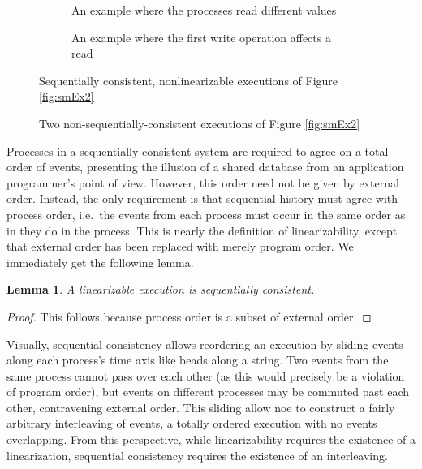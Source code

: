 \documentclass[]             %
{NASA}                       %
\newtheorem{lemma}[theorem]{Lemma}
\theoremstyle{definition}
\begin{document}
\begin{figure}[p]
  \begin{subfigure}{1\textwidth}
    \centering
    
    \caption{An example where the processes read different values}
    \label{fig:smEx1L1}
  \end{subfigure}
  \begin{subfigure}{1\textwidth}
    
    \caption{An example where the first write operation affects a read}
    \label{fig:smEx4S2}
  \end{subfigure}
  \caption{Sequentially consistent, nonlinearizable executions of Figure \ref{fig:smEx2}}
  \label{fig:smEx3}
\end{figure}
\begin{figure}[p]
  \begin{subfigure}{1\textwidth}
    \centering
    
    \caption{}
    \label{fig:smEx1L1}
  \end{subfigure}
  \begin{subfigure}{1\textwidth}
    
    \caption{}
    \label{fig:smEx4S2}
  \end{subfigure}
  \caption{Two non-sequentially-consistent executions of Figure \ref{fig:smEx2}}
  \label{fig:smEx3}
\end{figure}

Processes in a sequentially consistent system are required to agree on
a total order of events, presenting the illusion of a shared database
from an application programmer's point of view. However, this order
need not be given by external order. Instead, the only requirement is
that sequential history must agree with process order, i.e.~the events
from each process must occur in the same order as in they do in the
process.  This is nearly the definition of linearizability, except
that external order has been replaced with merely program order. We
immediately get the following lemma.

\begin{lemma}
  \label{lem:linearsequential}
  A linearizable execution is sequentially consistent.
\end{lemma}
\begin{proof}
  This follows because process order is a subset of external order.
\end{proof}

Visually, sequential consistency allows reordering an execution by
sliding events along each process's time axis like beads along a
string.  Two events from the same process cannot pass over each other
(as this would precisely be a violation of program order), but events
on different processes may be commuted past each other, contravening
external order. This sliding allow noe to construct a fairly arbitrary
interleaving of events, a totally ordered execution with no events
overlapping. From this perspective, while linearizability requires the
existence of a linearization, sequential consistency requires the
existence of an interleaving.
\end{document}
